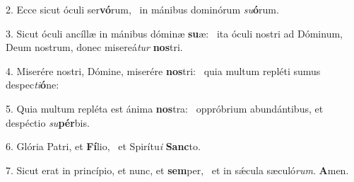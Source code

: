 2. Ecce sicut óculi ser\textbf{vó}rum, \ast\  in mánibus dominórum \textit{su}\textbf{ó}rum.\

3. Sicut óculi ancíllæ in mánibus dóminæ \textbf{su}æ: \ast\  ita óculi nostri ad Dóminum, Deum nostrum, donec misereá\textit{tur} \textbf{nos}tri.\

4. Miserére nostri, Dómine, miserére \textbf{nos}tri: \ast\  quia multum repléti sumus despec\textit{ti}\textbf{ó}ne:\

5. Quia multum repléta est ánima \textbf{nos}tra: \ast\  oppróbrium abundántibus, et despéctio \textit{su}\textbf{pér}bis.\

6. Glória Patri, et \textbf{Fí}lio, \ast\  et Spirítu\textit{i} \textbf{Sanc}to.\

7. Sicut erat in princípio, et nunc, et \textbf{sem}per, \ast\  et in sǽcula sæculó\textit{rum}. \textbf{A}men.\

